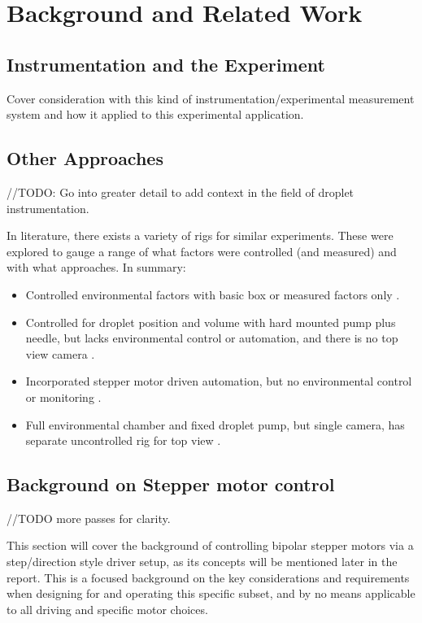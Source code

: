 \chapter{Background and Related Work}\label{C:back}


\section{Instrumentation and the Experiment}
Cover consideration with this kind of instrumentation/experimental measurement system and how it applied to this experimental application.

\section{Other Approaches}
//TODO: Go into greater detail to add context in the field of droplet instrumentation.

In literature, there exists a variety of rigs for similar experiments. These were explored to gauge a range of what factors were controlled (and measured) and with what approaches. In summary:
\begin{itemize}
    \item Controlled environmental factors with basic box \cite{step_book} or measured factors only \cite{measure_only}.
    \item Controlled for droplet position and volume with hard mounted pump plus needle, but lacks environmental control or automation, and there is no top view camera \cite{non_newt} \cite{fixed_pump}.
    \item Incorporated stepper motor driven automation, but no environmental control or monitoring \cite{motors}.
    \item Full environmental chamber and fixed droplet pump, but single camera, has separate uncontrolled rig for top view \cite{duel_rig}.
\end{itemize}

\newpage
\section{Background on Stepper motor control}
//TODO more passes for clarity.

This section will cover the background of controlling bipolar stepper motors via a step/direction style driver setup, as its concepts will be mentioned later in the report. This is a focused background on the key considerations and requirements when designing for and operating this specific subset, and by no means applicable to all driving and specific motor choices.

